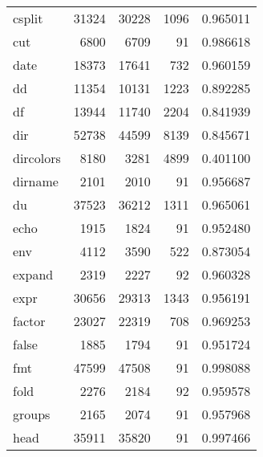 \begin{longtable}{lrrrr}
csplit    &                    31324 &        30228 &          1096 &                 0.965011 \\
cut       &                     6800 &         6709 &            91 &                 0.986618 \\
date      &                    18373 &        17641 &           732 &                 0.960159 \\
dd        &                    11354 &        10131 &          1223 &                 0.892285 \\
df        &                    13944 &        11740 &          2204 &                 0.841939 \\
dir       &                    52738 &        44599 &          8139 &                 0.845671 \\
dircolors &                     8180 &         3281 &          4899 &                 0.401100 \\
dirname   &                     2101 &         2010 &            91 &                 0.956687 \\
du        &                    37523 &        36212 &          1311 &                 0.965061 \\
echo      &                     1915 &         1824 &            91 &                 0.952480 \\
env       &                     4112 &         3590 &           522 &                 0.873054 \\
expand    &                     2319 &         2227 &            92 &                 0.960328 \\
expr      &                    30656 &        29313 &          1343 &                 0.956191 \\
factor    &                    23027 &        22319 &           708 &                 0.969253 \\
false     &                     1885 &         1794 &            91 &                 0.951724 \\
fmt       &                    47599 &        47508 &            91 &                 0.998088 \\
fold      &                     2276 &         2184 &            92 &                 0.959578 \\
groups    &                     2165 &         2074 &            91 &                 0.957968 \\
head      &                    35911 &        35820 &            91 &                 0.997466 \\

\end{longtable}
